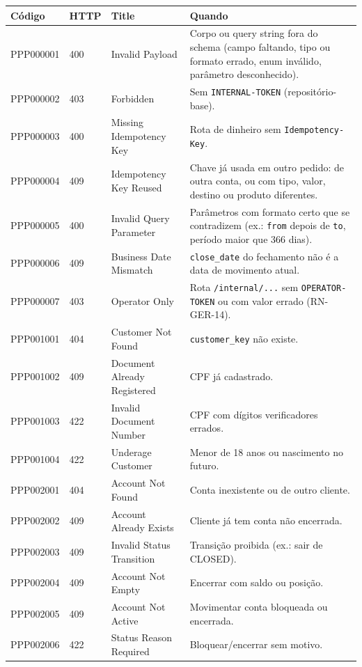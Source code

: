 \documentclass[11pt,a4paper]{article}
\newcommand{\tb}[1]{\texttt{#1}}           %
\begin{document}
\begingroup\small
\begin{longtable}{@{}P{1.9cm}P{1.1cm}P{4.3cm}P{8.0cm}@{}}
\toprule
\textbf{Código} & \textbf{HTTP} & \textbf{Title} & \textbf{Quando} \\
\midrule
\endhead
PPP000001 & 400 & Invalid Payload & Corpo ou query string fora do schema (campo faltando, tipo ou formato errado, enum inválido, parâmetro desconhecido). \\
PPP000002 & 403 & Forbidden & Sem \tb{INTERNAL-TOKEN} (repositório-base). \\
PPP000003 & 400 & Missing Idempotency Key & Rota de dinheiro sem \tb{Idempotency-Key}. \\
PPP000004 & 409 & Idempotency Key Reused & Chave já usada em outro pedido: de outra conta, ou com tipo, valor, destino ou produto diferentes. \\
PPP000005 & 400 & Invalid Query Parameter & Parâmetros com formato certo que se contradizem (ex.: \tb{from} depois de \tb{to}, período maior que 366 dias). \\
PPP000006 & 409 & Business Date Mismatch & \tb{close_date} do fechamento não é a data de movimento atual. \\
PPP000007 & 403 & Operator Only & Rota \tb{/internal/...} sem \tb{OPERATOR-TOKEN} ou com valor errado (RN-GER-14). \\
\midrule
PPP001001 & 404 & Customer Not Found & \tb{customer_key} não existe. \\
PPP001002 & 409 & Document Already Registered & CPF já cadastrado. \\
PPP001003 & 422 & Invalid Document Number & CPF com dígitos verificadores errados. \\
PPP001004 & 422 & Underage Customer & Menor de 18 anos ou nascimento no futuro. \\
\midrule
PPP002001 & 404 & Account Not Found & Conta inexistente ou de outro cliente. \\
PPP002002 & 409 & Account Already Exists & Cliente já tem conta não encerrada. \\
PPP002003 & 409 & Invalid Status Transition & Transição proibida (ex.: sair de CLOSED). \\
PPP002004 & 409 & Account Not Empty & Encerrar com saldo ou posição. \\
PPP002005 & 409 & Account Not Active & Movimentar conta bloqueada ou encerrada. \\
PPP002006 & 422 & Status Reason Required & Bloquear/encerrar sem motivo. \\

\end{longtable}
\end{document}
